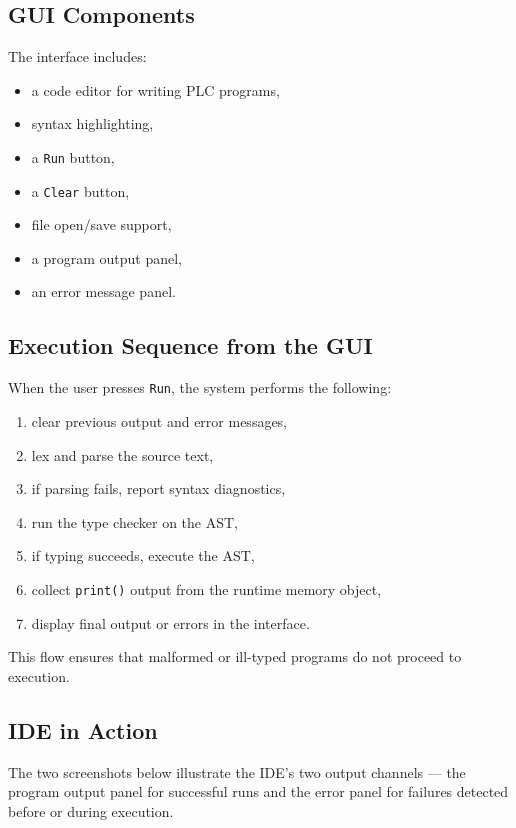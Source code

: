 \documentclass[12pt,a4paper]{article}
\begin{document}
\subsection{GUI Components}
The interface includes:

\begin{itemize}[leftmargin=1.0cm]
    \item a code editor for writing PLC programs,
    \item syntax highlighting,
    \item a \texttt{Run} button,
    \item a \texttt{Clear} button,
    \item file open/save support,
    \item a program output panel,
    \item an error message panel.
\end{itemize}

\subsection{Execution Sequence from the GUI}
When the user presses \texttt{Run}, the system performs the following:

\begin{enumerate}[leftmargin=1.2cm]
    \item clear previous output and error messages,
    \item lex and parse the source text,
    \item if parsing fails, report syntax diagnostics,
    \item run the type checker on the AST,
    \item if typing succeeds, execute the AST,
    \item collect \texttt{print()} output from the runtime memory object,
    \item display final output or errors in the interface.
\end{enumerate}

This flow ensures that malformed or ill-typed programs do not proceed to execution.

\subsection{IDE in Action}
The two screenshots below illustrate the IDE's two output channels --- the program output panel for successful runs and the error panel for failures detected before or during execution.
\end{document}
